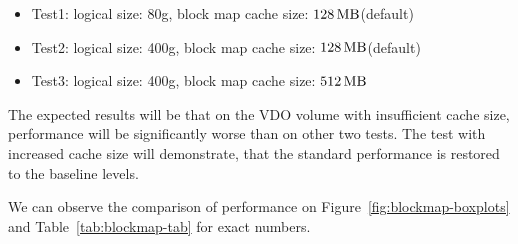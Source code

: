 \documentclass[
  color, %
  table, %
  lof,   %
  lot,   %
]{fithesis3}
\begin{document}




\begin{itemize}
    \item Test1: logical size: 80g, block map cache size: $\SI{128}{\mega\byte}$(default)
    \item Test2: logical size: 400g, block map cache size: $\SI{128}{\mega\byte}$(default)
    \item Test3: logical size: 400g, block map cache size: $\SI{512}{\mega\byte}$ 
\end{itemize}

The expected results will be that on the VDO volume with insufficient cache size, performance will be significantly worse than on other two tests. The test with increased cache size will demonstrate, that the standard performance is restored to the baseline levels.

We can observe the comparison of performance on Figure~\ref{fig:blockmap-boxplots} and Table~\ref{tab:blockmap-tab} for exact numbers.
\end{document}

